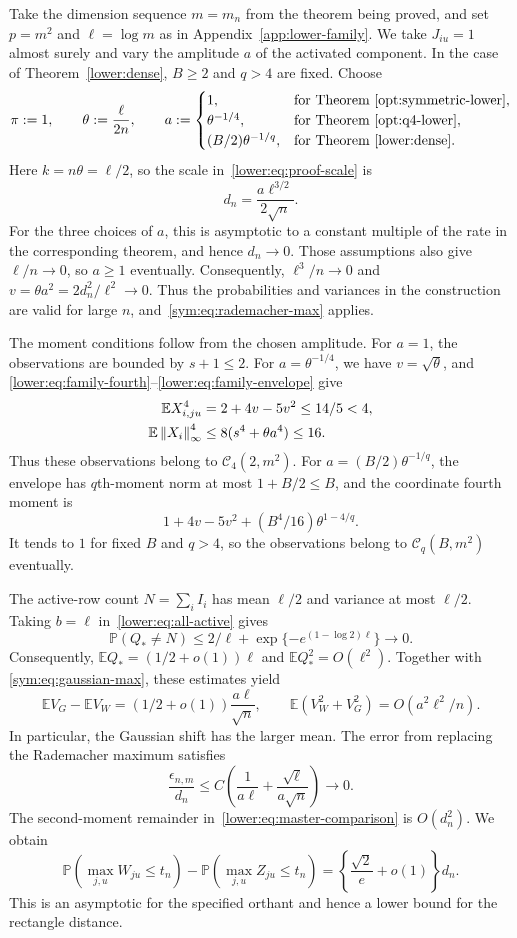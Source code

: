 \documentclass[11pt,letterpaper]{article}
\theoremstyle{remark}
\newcommand{\E}{\mathbb E}
\newcommand{\Pp}{\mathbb P}
\newcommand{\norm}[1]{\left\lVert#1\right\rVert}
\begin{document}
Take the dimension sequence \(m=m_n\) from the theorem being
proved, and set \(p=m^2\) and \(\ell=\log m\) as in
Appendix~\ref{app:lower-family}. We take \(J_{iu}=1\) almost surely
and vary the amplitude \(a\) of the activated component. In the case
of Theorem~\ref{lower:dense}, \(B\ge2\) and \(q>4\) are fixed.
Choose
\[
 \pi:=1,\qquad \theta:=\frac{\ell}{2n},\qquad
 a:=\begin{cases}
 1,&\text{for Theorem~\ref{opt:symmetric-lower}},\\
 \theta^{-1/4},&\text{for Theorem~\ref{opt:q4-lower}},\\
 (B/2)\theta^{-1/q},&\text{for Theorem~\ref{lower:dense}}.
 \end{cases}
\]
Here \(k=n\theta=\ell/2\), so
the scale in~\eqref{lower:eq:proof-scale} is
\[
 d_n=\frac{a\ell^{3/2}}{2\sqrt n}.
\]
For the three choices of \(a\), this is asymptotic to a constant multiple of the
rate in the corresponding theorem, and hence \(d_n\to0\).
Those assumptions also give \(\ell/n\to0\), so \(a\ge1\)
eventually. Consequently, \(\ell^3/n\to0\) and
\(v=\theta a^2=2d_n^2/\ell^2\to0\).
Thus the probabilities and variances in the construction are valid
for large \(n\), and~\eqref{sym:eq:rademacher-max} applies.

The moment conditions follow from the chosen amplitude.
For \(a=1\), the observations are bounded by \(s+1\le2\).
For \(a=\theta^{-1/4}\), we have \(v=\sqrt\theta\), and
\eqref{lower:eq:family-fourth}--\eqref{lower:eq:family-envelope} give
\begin{align}
 \E X_{i,ju}^4&=2+4v-5v^2\le14/5<4,\notag\\
 \E\norm{X_i}_\infty^4
 &\le8(s^4+\theta a^4)\le16.
 \label{sym:eq:q4-moments}
\end{align}
Thus these observations belong to \(\mathcal C_4(2,m^2)\).
For \(a=(B/2)\theta^{-1/q}\), the envelope has \(q\)th-moment
norm at most \(1+B/2\le B\), and the coordinate fourth moment is
\[
 1+4v-5v^2+(B^4/16)\theta^{1-4/q}.
\]
It tends to \(1\) for fixed \(B\) and \(q>4\), so the observations
belong to \(\mathcal C_q(B,m^2)\) eventually.

The active-row count \(N=\sum_iI_i\) has mean \(\ell/2\)
and variance at most \(\ell/2\).
Taking \(b=\ell\) in~\eqref{lower:eq:all-active} gives
\[
 \Pp(Q_*\ne N)\le 2/\ell+
       \exp\{-e^{(1-\log2)\ell}\}\longrightarrow0.
\]
Consequently, \(\E Q_*=(1/2+o(1))\ell\) and
\(\E Q_*^2=O(\ell^2)\). Together with
\eqref{sym:eq:gaussian-max}, these estimates yield
\[
 \E V_G-\E V_W=(1/2+o(1))\frac{a\ell}{\sqrt n},
 \qquad
 \E(V_W^2+V_G^2)=O(a^2\ell^2/n).
\]
In particular, the Gaussian shift has the larger mean.
The error from replacing the Rademacher maximum satisfies
\[
 \frac{\epsilon_{n,m}}{d_n}
 \le C\left(\frac1{a\ell}+\frac{\sqrt\ell}{a\sqrt n}\right)\to0.
\]
The second-moment remainder in~\eqref{lower:eq:master-comparison}
is \(O(d_n^2)\). We obtain
\begin{equation}
 \Pp(\max_{j,u}W_{ju}\le t_n)-\Pp(\max_{j,u}Z_{ju}\le t_n)
 =\left\{\frac{\sqrt2}{e}+o(1)\right\}d_n.
 \label{sym:eq:common-discrepancy}
\end{equation}
This is an asymptotic for the specified orthant and hence a lower
bound for the rectangle distance.
\end{document}

